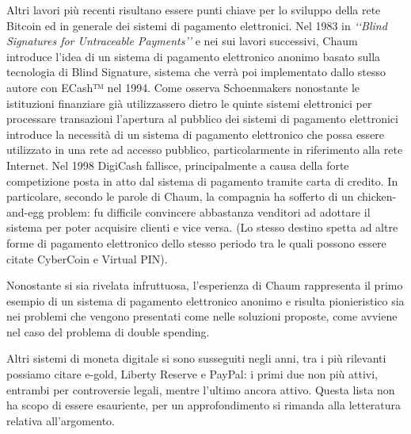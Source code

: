 Altri lavori più recenti risultano essere punti chiave per lo sviluppo della rete Bitcoin ed in generale dei sistemi di pagamento elettronici.
Nel 1983 in \textit{‘‘Blind Signatures for Untraceable Payments’’} e nei sui lavori successivi\cite{K6,K7}, Chaum introduce l’idea di un sistema di pagamento elettronico anonimo basato sulla tecnologia di Blind Signature, sistema che verrà poi implementato dallo stesso autore con ECash™ nel 1994. Come osserva Schoenmakers\cite{K8} nonostante le istituzioni finanziare già utilizzassero dietro le quinte sistemi elettronici per processare transazioni l’apertura al pubblico dei sistemi di pagamento elettronici introduce la necessità di un sistema di pagamento elettronico che possa essere utilizzato in una rete ad accesso pubblico, particolarmente in riferimento alla rete Internet. Nel 1998 DigiCash fallisce, principalmente a causa della forte competizione posta in atto dal sistema di pagamento tramite carta di credito. In particolare, secondo le parole di Chaum, la compagnia ha sofferto di un chicken-and-egg problem: fu difficile convincere abbastanza venditori ad adottare il sistema per poter acquisire clienti e vice versa. (Lo stesso destino spetta ad altre forme di pagamento elettronico dello stesso periodo tra le quali possono essere citate CyberCoin e Virtual PIN).

Nonostante si sia rivelata infruttuosa, l’esperienza di Chaum rappresenta il primo esempio di un sistema di pagamento elettronico anonimo e risulta pionieristico sia nei problemi che vengono presentati come nelle soluzioni proposte, come avviene nel caso del problema di double spending. 

Altri sistemi di moneta digitale si sono susseguiti negli anni, tra i più rilevanti possiamo citare e-gold, Liberty Reserve e PayPal: i primi due non più attivi, entrambi per controversie legali, mentre l’ultimo ancora attivo. Questa lista non ha scopo di essere esauriente, per un approfondimento si rimanda alla letteratura relativa all'argomento.

